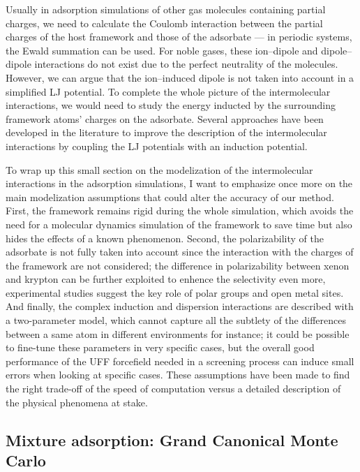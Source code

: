 \documentclass[main.tex]{subfiles}
\begin{document}
Usually in adsorption simulations of other gas molecules containing partial charges, we need to calculate the Coulomb interaction between the partial charges of the host framework and those of the adsorbate --- in periodic systems, the Ewald summation can be used. For noble gases, these ion--dipole and dipole--dipole interactions do not exist due to the perfect neutrality of the molecules. However, we can argue that the ion--induced dipole is not taken into account in a simplified LJ potential. To complete the whole picture of the intermolecular interactions, we would need to study the energy inducted by the surrounding framework atoms’ charges on the adsorbate. Several approaches have been developed in the literature to improve the description of the intermolecular interactions by coupling the LJ potentials with an induction potential.\autocite{Lachet_1998,Becker_2017} 

To wrap up this small section on the modelization of the intermolecular interactions in the adsorption simulations, I want to emphasize once more on the main modelization assumptions that could alter the accuracy of our method. First, the framework remains rigid during the whole simulation, which avoids the need for a molecular dynamics simulation of the framework to save time but also hides the effects of a known phenomenon.\autocite{Witman_2017} Second, the polarizability of the adsorbate is not fully taken into account since the interaction with the charges of the framework are not considered; the difference in polarizability between xenon and krypton can be further exploited to enhence the selectivity even more, experimental studies suggest the key role of polar groups and open metal sites.\autocite{Li_2019,Pei_2022,Perry_2014} And finally, the complex induction and dispersion interactions are described with a two-parameter model, which cannot capture all the subtlety of the differences between a same atom in different environments for instance; it could be possible to fine-tune these parameters in very specific cases, but the overall good performance \autocite{McDaniel_2015} of the UFF forcefield needed in a screening process can induce small errors when looking at specific cases.
These assumptions have been made to find the right trade-off of the speed of computation versus a detailed description of the physical phenomena at stake. 


\subsection{Mixture adsorption: Grand Canonical Monte Carlo}\label{sct:GCMC}
\end{document}
